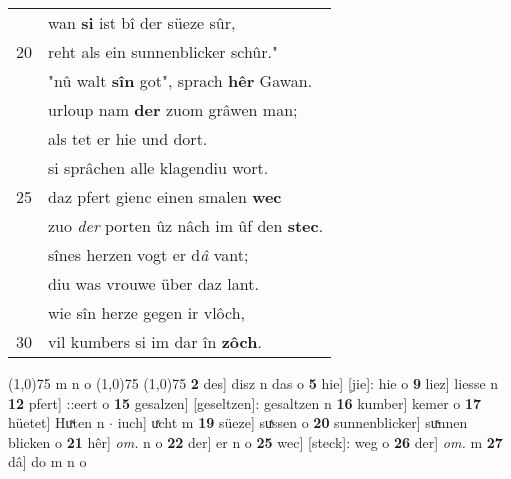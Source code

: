 \documentclass[8pt,a4paper,notitlepage]{article}
\begin{document}
\begin{table}[ht]
\begin{minipage}[t]{0.5\linewidth}
\begin{tabular}{rl}
 & wan \textbf{si} ist bî der süeze sûr,\\ 
20 & reht als ein sunnenblicker schûr."\\ 
 & "nû walt \textbf{sîn} got", sprach \textbf{hêr} Gawan.\\ 
 & urloup nam \textbf{der} zuom grâwen man;\\ 
 & als tet er hie und dort.\\ 
 & si sprâchen alle klagendiu wort.\\ 
25 & daz pfert gienc einen smalen \textbf{wec}\\ 
 & zuo \textit{der} porten ûz nâch im ûf den \textbf{stec}.\\ 
 & sînes herzen vogt er d\textit{â} vant;\\ 
 & diu was vrouwe über daz lant.\\ 
 & wie sîn herze gegen ir vlôch,\\ 
30 & vil kumbers si im dar în \textbf{zôch}.\\ 
\end{tabular}
\scriptsize
\line(1,0){75} \newline
m n o \newline
\line(1,0){75} \newline
\newline
\line(1,0){75} \newline
\textbf{2} des] disz n das o \textbf{5} hie] [jie]: hie o \textbf{9} liez] liesse n \textbf{12} pfert] ::eert o \textbf{15} gesalzen] [geseltzen]: gesaltzen n \textbf{16} kumber] kemer o \textbf{17} hüetet] Huͯten n  $\cdot$ iuch] uͯcht m \textbf{19} süeze] suͯssen o \textbf{20} sunnenblicker] suͯnnen blicken o \textbf{21} hêr] \textit{om.} n o \textbf{22} der] er n o \textbf{25} wec] [steck]: weg o \textbf{26} der] \textit{om.} m \textbf{27} dâ] do m n o \newline
\end{minipage}
\end{table}
\newpage
\end{document}
